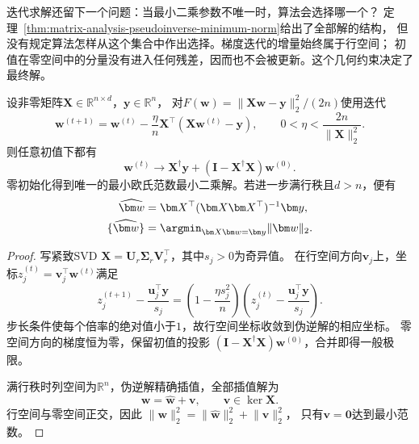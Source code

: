 迭代求解还留下一个问题：当最小二乘参数不唯一时，算法会选择哪一个？
定理~\ref{thm:matrix-analysis-pseudoinverse-minimum-norm}给出了全部解的结构，
但没有规定算法怎样从这个集合中作出选择。梯度迭代的增量始终属于行空间；
初值在零空间中的分量没有进入任何残差，因而也不会被更新。这个几何约束决定了最终解。

\begin{theorem}[最小二乘梯度迭代的解选择]
\label{thm:gradient-descent-minimum-norm}
设非零矩阵$\bm X\in\mathbb R^{n\times d}$，$\bm y\in\mathbb R^n$，
对$F(\bm w)=\lVert\bm X\bm w-\bm y\rVert_2^2/(2n)$使用迭代
\[
 \bm w^{(t+1)}=\bm w^{(t)}-\frac\eta n
     \bm X^{\top}(\bm X\bm w^{(t)}-\bm y),
 \qquad 0<\eta<\frac{2n}{\lVert\bm X\rVert_2^2}.
\]
则任意初值下都有
\begin{equation}
 \bm w^{(t)}\longrightarrow
 \bm X^{\dagger}\bm y+
       (\bm I-\bm X^{\dagger}\bm X)\bm w^{(0)}.
 \label{eq:matrix-analysis-gradient-limit}
\end{equation}
零初始化得到唯一的最小欧氏范数最小二乘解。若进一步满行秩且$d>n$，便有
\begin{equation}
 \begin{aligned}
 \widehat{\bm w}&=\bm X^{\top}(\bm X\bm X^{\top})^{-1}\bm y,\\
 \{\widehat{\bm w}\}&=\argmin_{\bm X\bm w=\bm y}\lVert\bm w\rVert_2.
 \end{aligned}
 \label{eq:minimum-norm-interpolator}
\end{equation}
\end{theorem}

\begin{proof}
写紧致SVD $\bm X=\bm U_r\bm\Sigma_r\bm V_r^{\top}$，其中$s_j>0$为奇异值。
在行空间方向$\bm v_j$上，坐标$z_j^{(t)}=\bm v_j^{\top}\bm w^{(t)}$满足
\[
 z_j^{(t+1)}-\frac{\bm u_j^{\top}\bm y}{s_j}
 =\left(1-\frac{\eta s_j^2}{n}\right)
   \left(z_j^{(t)}-\frac{\bm u_j^{\top}\bm y}{s_j}\right).
\]
步长条件使每个倍率的绝对值小于$1$，故行空间坐标收敛到伪逆解的相应坐标。
零空间方向的梯度恒为零，保留初值的投影
$(\bm I-\bm X^{\dagger}\bm X)\bm w^{(0)}$，合并即得一般极限。

满行秩时列空间为$\mathbb R^n$，伪逆解精确插值，全部插值解为
\begin{equation}
 \bm w=\widehat{\bm w}+\bm v,\qquad \bm v\in\ker\bm X.
 \label{eq:interpolator-decomposition}
\end{equation}
行空间与零空间正交，因此
$\lVert\bm w\rVert_2^2=\lVert\widehat{\bm w}\rVert_2^2+\lVert\bm v\rVert_2^2$，
只有$\bm v=\bm0$达到最小范数。
\end{proof}

